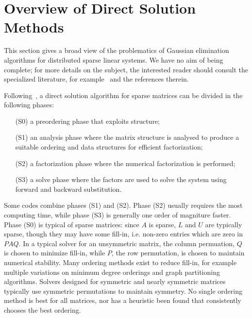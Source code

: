 \documentclass[acmtocl]{acmtrans2m}
\begin{document}
\section{Overview of Direct Solution Methods}
\label{sec:overview}

This section gives a broad view of the problematics of Gaussian elimination
algorithms for distributed sparse linear systems. We have no aim of being
complete; for more details on the subject, the interested reader should
consult the specialized literature, for
example~\cite{duff86direct,duff97sparse} and the references therein. 

\smallskip

Following~\cite[Chapter 6]{dongarra98numerical}, a direct solution algorithm
for sparse matrices can be divided in the following phases:
\begin{itemize}
\item[(S0)] a preordering phase that exploits structure;
\item[(S1)] an analysis phase where the matrix structure is analysed to produce a
suitable ordering and data structures for efficient factorization;
\item[(S2)] a factorization phase where the numerical factorization is performed;
\item[(S3)] a solve phase where the factors are used to solve the system using
forward and backward substitution.
\end{itemize}
Some codes combine phases (S1) and (S2). Phase (S2) usually requires the most
computing time, while phase (S3) is generally one order of magniture faster.
Phase (S0) is typical of sparse matrices:
since $A$ is sparse, $L$ and $U$ are typically sparse, though they may have some
fill-in, i.e. non-zero entries which are zero in $PAQ$.  
In a typical solver for an unsymmetric matrix, the column permuation,
$Q$ is chosen to minimize fill-in, while $P$, the row permutation, is
chosen to maintain numerical stability.  
Many ordering methods exist to reduce fill-in, for example multiple variations
on minimum degree orderings and graph partitioning algorithms.  Solvers
designed for symmetric and nearly symmetric matrices typically use symmetric
permutations to maintain symmetry.  No single ordering method is best for all
matrices, nor has a heuristic been found that consistently chooses the best
ordering\cite{BaumannFleischmannMutzbauer03,AmestoyDavisDuff03}. 
\end{document}
